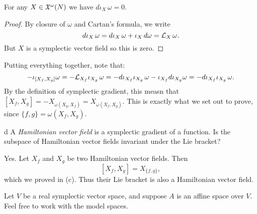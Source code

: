 \documentclass{pset}
\begin{document}
\begin{parts}
    \begin{claim}
        For any $X\in \mathfrak{X}^\omega(N)$ we have $d\iota_X\,\omega = 0$.
    \end{claim}

    \begin{proof}
        By closure of $\omega$ and Cartan's formula, we write
        \[
            d\iota_X\,\omega = d\iota_X\,\omega + \iota_X\,d\omega = \mathcal{L}_X\,\omega
        .\]
        But $X$ is a symplectic vector field so this is zero.
    \end{proof}

    Putting everything together, note that:
    \[
        -\iota_{[X_f, X_g]}\omega = -\mathcal{L}_{X_f}\iota_{X_g}\,\omega = -d\iota_{X_f}\iota_{X_g}\,\omega-\iota_{X_f}d\iota_{X_g}\omega = -d\iota_{X_f}\iota_{X_g}\,\omega
    .\] 
    By the definition of symplectic gradient, this measn that $[X_f,X_g]=-X_{\omega(X_g, X_f)}=X_{\omega(X_f, X_g)}$. This is exactly what we set out to prove, since $\{f,g\} = \omega(X_f,X_g)$.

    \begin{part}{d}
        A \emph{Hamiltonian vector field} is a symplectic gradient of a function. Is the subspace of Hamiltonian vector fields invariant under the Lie bracket?
    \end{part}

    Yes. Let $X_f$ and $X_g$ be two Hamiltonian vector fields. Then
    \[
        [X_f, X_g] = X_{\{f,g\}},
    \]
    which we proved in (c). Thus their Lie bracket is also a Hamiltonian vector field.
\end{parts}

\begin{problem}{2}
    Let $V$ be a real symplectic vector space, and suppose $A$ is an affine space over $V$. Feel free to work with the model spaces.
\end{problem}
\end{document}
